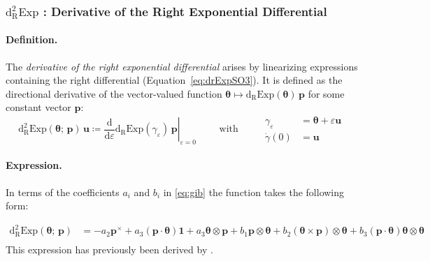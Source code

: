 \hypertarget{sec:ddrExpSO3}{%
\subsubsection{\texorpdfstring{\(\operatorname{d^2_{\scriptscriptstyle{R}}Exp}\)
: Derivative of the Right Exponential
Differential}{ddrExpSO3 : Derivative of the Right Exponential Differential}}\label{sec:ddrExpSO3}}

\paragraph*{Definition.}
The \emph{derivative of the right exponential differential} arises by linearizing expressions containing the right differential (Equation~\ref{eq:drExpSO3}).
It is defined %
as the directional derivative of the vector-valued function \(\bm{\theta}\mapsto \operatorname{d_{\scriptscriptstyle{R}}Exp}(\bm{\theta})\,\bm{p}\)
for some constant vector \(\bm{p}\):
%
\begin{equation*} 
\operatorname{d^2_{\scriptscriptstyle{R}}Exp}(\bm{\theta}; \, \bm{p}) \, \bm{u} 
  \coloneq \left.\frac{\mathrm{d}}{\mathrm{d} \varepsilon}\left.\operatorname{d_{\scriptscriptstyle{R}}Exp}({\gamma_{\varepsilon}})\right. \, \bm{p}\right|_{\varepsilon=0} 
\qquad\text{ with }\qquad
\begin{aligned}
\gamma_{\varepsilon} &= \bm{\theta} + \varepsilon \bm{u} \\
\dot{\gamma}(0) &= \bm{u}
\end{aligned}
\end{equation*}
 

\paragraph*{Expression.}

In terms of the coefficients \(a_i\) and \(b_i\) in \eqref{eq:gib}
the function takes the following form:

\begin{equation}
\begin{aligned}
\operatorname{d^2_{\scriptscriptstyle{R}}Exp}(\bm{\theta}; \, \bm{p})
&=-a_2 \bm{p}^{\times}+a_3\left(\bm{p} \cdot \bm{\theta}\right) \mathbf{1}+a_3 \bm{\theta} \otimes \bm{p}
 + b_1 \bm{p} \otimes \bm{\theta}
 +b_2 \left(\bm{\theta}\times \bm{p}\right) \otimes \bm{\theta} 
 +b_3\left(\bm{p} \cdot \bm{\theta}\right) \bm{\theta} \otimes \bm{\theta} \\
\end{aligned}
\label{eq:ddlExpSO3}
\end{equation}
This expression has previously been derived by \cite{cardona1988beam}.

